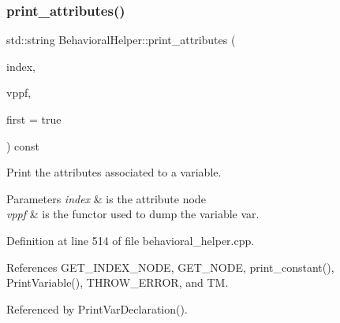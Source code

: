 \subsubsection{\texorpdfstring{print\+\_\+attributes()}{print\_attributes()}}
{\footnotesize\ttfamily std\+::string Behavioral\+Helper\+::print\+\_\+attributes (\begin{DoxyParamCaption}\item[{unsigned int}]{index,  }\item[{const \hyperlink{var__pp__functor_8hpp_a8a6b51b6519401d911398943510557f0}{var\+\_\+pp\+\_\+functor\+Const\+Ref}}]{vppf,  }\item[{bool}]{first = {\ttfamily true} }\end{DoxyParamCaption}) const\hspace{0.3cm}{\ttfamily [virtual]}}



Print the attributes associated to a variable. 


\begin{DoxyParams}{Parameters}
{\em index} & is the attribute node \\
\hline
{\em vppf} & is the functor used to dump the variable var. \\
\hline
\end{DoxyParams}


Definition at line 514 of file behavioral\+\_\+helper.\+cpp.



References G\+E\+T\+\_\+\+I\+N\+D\+E\+X\+\_\+\+N\+O\+DE, G\+E\+T\+\_\+\+N\+O\+DE, print\+\_\+constant(), Print\+Variable(), T\+H\+R\+O\+W\+\_\+\+E\+R\+R\+OR, and TM.



Referenced by Print\+Var\+Declaration().

